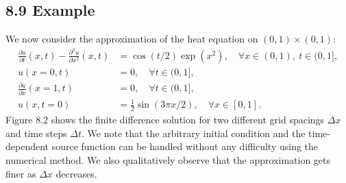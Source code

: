 \subsection{8.9 Example}
We now consider the approximation of the heat equation on $(0, 1) \times (0, 1)$:
\begin{equation*}
    \begin{aligned}
        \frac{\partial u}{\partial t}(x, t) - \frac{\partial^2 u}{\partial x^2}(x, t) &= \cos(t/2) \exp(x^2), \quad \forall x \in (0, 1), \ t \in (0, 1], \\
        u(x = 0, t) &= 0, \quad \forall t \in (0, 1], \\
        \frac{\partial u}{\partial x}(x = 1, t) &= 0, \quad \forall t \in (0, 1], \\
        u(x, t = 0) &= \frac{1}{2} \sin(3\pi x/2), \quad \forall x \in [0, 1].
    \end{aligned} \tag{8.8}
\end{equation*}
Figure 8.2 shows the finite difference solution for two different grid spacings $\Delta x$ and time steps $\Delta t$. We note that the arbitrary initial condition and the time-dependent source function can be handled without any difficulty using the numerical method. We also qualitatively observe that the approximation gets finer as $\Delta x$ decreases.


